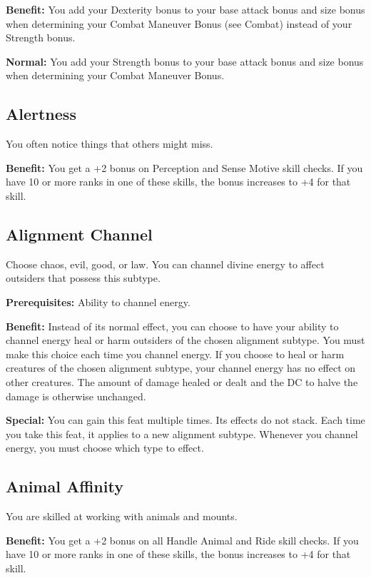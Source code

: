 \textbf{Benefit:} You add your Dexterity bonus to your base attack bonus and size bonus when determining your Combat Maneuver Bonus (see Combat) instead of your Strength bonus.
				
\textbf{Normal:} You add your Strength bonus to your base attack bonus and size bonus when determining your Combat Maneuver Bonus.
				
\subsection{Alertness}

				
You often notice things that others might miss.
				
\textbf{Benefit:} You get a +2 bonus on Perception and Sense Motive skill checks. If you have 10 or more ranks in one of these skills, the bonus increases to +4 for that skill.
				
\subsection{Alignment Channel}

				
Choose chaos, evil, good, or law. You can channel divine energy to affect outsiders that possess this subtype.
				
\textbf{Prerequisites:} Ability to channel energy.
				
\textbf{Benefit:} Instead of its normal effect, you can choose to have your ability to channel energy heal or harm outsiders of the chosen alignment subtype. You must make this choice each time you channel energy. If you choose to heal or harm creatures of the chosen alignment subtype, your channel energy has no effect on other creatures. The amount of damage healed or dealt and the DC to halve the damage is otherwise unchanged.
				
\textbf{Special:} You can gain this feat multiple times. Its effects do not stack. Each time you take this feat, it applies to a new alignment subtype. Whenever you channel energy, you must choose which type to effect.
				
\subsection{Animal Affinity}

				
You are skilled at working with animals and mounts.
				
\textbf{Benefit:} You get a +2 bonus on all Handle Animal and Ride skill checks. If you have 10 or more ranks in one of these skills, the bonus increases to +4 for that skill.
				
